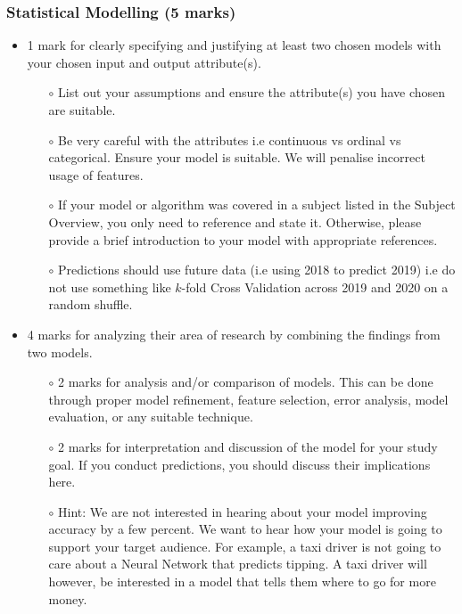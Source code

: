\documentclass[12pt]{article}
\begin{document}
\subsubsection*{Statistical Modelling (5 marks)}
\begin{itemize}
    \item 1 mark for clearly specifying and justifying at least two chosen models with your chosen input and output attribute(s). 
    \begin{itemize}
        \item[$\circ$] List out your assumptions and ensure the attribute(s) you have chosen are suitable.
        \item[$\circ$] Be very careful with the attributes i.e continuous vs ordinal vs categorical. Ensure your model is suitable. We will penalise incorrect usage of features.
        \item[$\circ$] If your model or algorithm was covered in a subject listed in the Subject Overview, you only need to reference and state it. Otherwise, please provide a brief introduction to your model with appropriate references.
        \item[$\circ$] Predictions should use future data (i.e using 2018 to predict 2019) i.e do not use something like $k$-fold Cross Validation across 2019 and 2020 on a random shuffle.
    \end{itemize}
    \item 4 marks for analyzing their area of research by combining the findings from two models.
    \begin{itemize}
        \item[$\circ$] 2 marks for analysis and/or comparison of models. This can be done through proper model refinement, feature selection, error analysis, model evaluation, or any suitable technique.
        \item[$\circ$] 2 marks for interpretation and discussion of the model for your study goal. If you conduct predictions, you should discuss their implications here.
        \item[$\circ$] Hint: We are not interested in hearing about your model improving accuracy by a few percent. We want to hear how your model is going to support your target audience. For example, a taxi driver is not going to care about a Neural Network that predicts tipping. A taxi driver will however, be interested in a model that tells them where to go for more money.
    \end{itemize}
\end{itemize}
\end{document}
